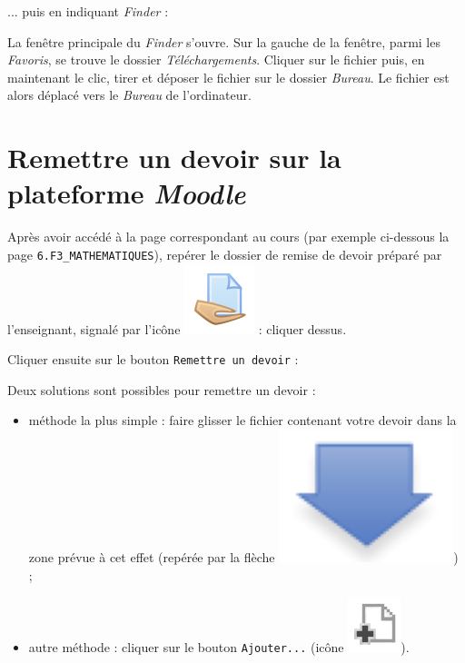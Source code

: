 ... puis en indiquant \emph{Finder} :


La fenêtre principale du \emph{Finder} s'ouvre. Sur la gauche de la fenêtre, parmi les \emph{Favoris}, se trouve le dossier \emph{Téléchargements}. Cliquer sur le fichier puis, en maintenant le clic, tirer et déposer le fichier sur le dossier \emph{Bureau}. Le fichier est alors déplacé vers le \emph{Bureau} de l'ordinateur.  


 





\section{Remettre un devoir sur la plateforme \emph{Moodle}}\label{MoodleRendreDevoir}

Après avoir accédé à la page correspondant au cours (par exemple ci-dessous la page \texttt{6.F3\_MATHEMATIQUES}), repérer le dossier de remise de devoir préparé par l'enseignant, signalé par l'icône \includegraphics[width=.04\textwidth]{./images/methode/MoodleDevoirIcone1} : cliquer dessus.


Cliquer ensuite sur le bouton \texttt{Remettre un devoir} :


Deux solutions sont possibles pour remettre un devoir :
\begin{itemize}
\item méthode la plus simple : faire glisser le fichier contenant votre devoir dans la zone prévue à cet effet (repérée par la flèche \includegraphics[width=.04\textwidth]{./images/methode/MoodleDevoirIcone2}) ;
\item autre méthode : cliquer sur le bouton \texttt{Ajouter...} (icône \includegraphics[width=.04\textwidth]{./images/methode/MoodleDevoirIcone3}).
\end{itemize}

